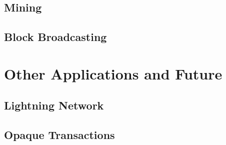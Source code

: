 \documentclass{beamer}
\begin{document}
\subsection{Mining}

\begin{frame}
\end{frame}

\subsection{Block Broadcasting}

\begin{frame}
\end{frame}

\section{Other Applications and Future}

\subsection{Lightning Network}

\begin{frame}
\end{frame}

\subsection{Opaque Transactions}

\begin{frame}
\end{frame}
\end{document}
